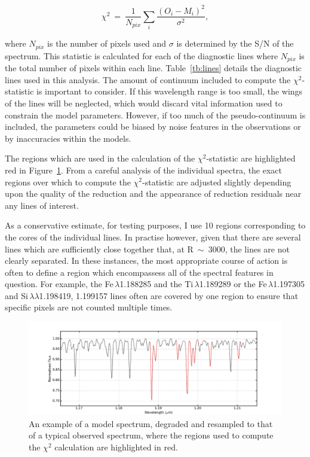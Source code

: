 \begin{equation}
    \chi^{2}~=~\frac{1}{N_{pix}}\sum\limits_{i}{\frac{(O_{i} - M_{i})^{2}}{\sigma^{2}}},\label{eq:chisq}
\end{equation}

where $N_{pix}$ is the number of pixels used
and $\sigma$ is determined by the S/N of the spectrum.
This statistic is calculated for each of the diagnostic lines where $N_{pix}$ is the total number of pixels within each line.
Table~\ref{tb:lines} details the diagnostic lines used in this analysis.
The amount of continuum included to compute the $\chi^{2}$-statistic is important to consider.
If this wavelength range is too small, the wings of the lines will be neglected,
which would discard vital information used to constrain the model parameters.
However, if too much of the pseudo-continuum is included, the parameters could be biased by noise features in the observations or by inaccuracies within the models.

The regions which are used in the calculation of the $\chi^{2}$-statistic are highlighted red in
Figure~\ref{fig:lines}.
From a careful analysis of the individual spectra, the exact regions over which to compute the $\chi^{2}$-statistic are adjusted slightly depending upon the quality of the reduction and the appearance of reduction residuals near any lines of interest.

As a conservative estimate, for testing purposes, I use 10 regions corresponding to the cores of the individual lines.
In practise however, given that there are several lines which are sufficiently
close together that, at R~$\sim$~3000,
the lines are not clearly separated.
In these instances, the most appropriate course of action is often to define a region which encompassess all of the spectral features in question.
For example, the Fe\,\1$\lambda$1.188285 and the Ti\,\1$\lambda$1.189289
or the Fe\,\1$\lambda$1.197305 and Si\,\1$\lambda\lambda$1.198419, 1.199157 lines often are covered by one region to ensure that specific pixels are not counted multiple times.


\begin{figure}
 \centering
 \includegraphics[width=\textwidth]{JAnal/Diag-lines}
 \caption[A model spectum highlighting the diagnostic lines used in the analysis routines]{
An example of a model spectrum, degraded and resampled to that of a typical observed spectrum, where the regions used to compute the $\chi^{2}$ calculation are highlighted in red.
\label{fig:lines}
         }
\end{figure}

